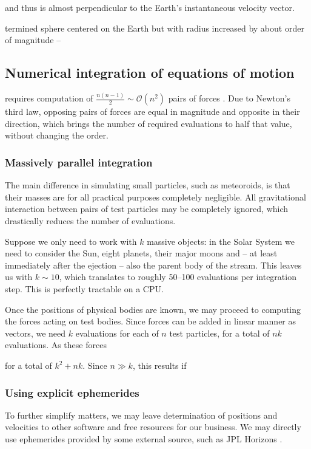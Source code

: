      and thus is almost perpendicular to the Earth's instantaneous velocity vector.



    termined sphere centered on the Earth but with
    radius increased by about  order of magnitude --

    \subsection{Numerical integration of equations of motion} \label{asi}
        requires computation of $\frac{n\left(n - 1\right)}{2} \sim \mathcal{O}(n^2)$ pairs of forces \cite{...}.
        Due to Newton's third law, opposing pairs of forces are equal in magnitude and opposite in their direction,
        which brings the number of required evaluations to half that value, without changing the order.

        \subsubsection{Massively parallel integration} \label{asip}
            The main difference in simulating small particles, such as meteoroids,
            is that their masses are for all practical purposes completely negligible.
            All gravitational interaction between pairs of test particles may be completely ignored,
            which drastically reduces the number of evaluations.

            Suppose we only need to work with $k$ massive objects:
            in the Solar System we need to consider the Sun, eight planets, their major moons
            and -- at least immediately after the ejection -- also the parent body of the stream.
            This leaves us with $k \sim 10$, which translates to roughly 50--100 evaluations per integration step.
            This is perfectly tractable on a CPU.

            Once the positions of physical bodies are known, we may proceed to computing the forces acting
            on test bodies. Since forces can be added in linear manner as vectors, we need $k$ evaluations
            for each of $n$ test particles, for a total of $nk$ evaluations. As these forces 
            
            for a total of $k^2 + nk$. Since $n \gg k$, this results if

        \subsubsection{Using explicit ephemerides} \label{asie}
            To further simplify matters, we may leave determination of positions and velocities to other software
            and free resources for our business.
            We may directly use ephemerides provided by some external source, such as JPL Horizons \cite{...}.

